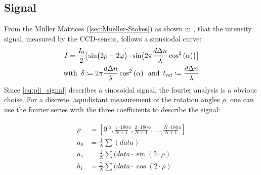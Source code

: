 \subsection{Signal}
% 
From the M\"{u}ller Matrices (\cref{sec:Mueller-Stokes}) as shown in \cite{MenzelMaster,MenzelDissertation}, that the intensity signal, measured by the \ac{CCD}-sensor, follows a sinusiodal curve:
% 
\begin{align}
\label{eq:pli_signal}
\begin{split}
I =\frac{I_0}{2}\bigl[ \sin\bigl(2\rho - 2\varphi \bigr)\cdot \sin \bigl( 2\pi\frac{d \textnormal{$\Delta n$}}{\lambda} \cos^2\left( \alpha \right) \bigr) \bigr] \\
\text{with} \enspace \delta \coloneqq 2\pi\frac{d \textnormal{$\Delta n$}}{\lambda} \cos^2\left( \alpha \right) \enspace 
\text{and} \enspace \textnormal{$t_\mathit{rel}$} \coloneqq \frac{d \textnormal{$\Delta n$}}{\lambda}
\end{split}
\end{align}
% 
Since \cref{eq:pli_signal} describes a sinosoidal signal, the fourier analysis is a obvious choise.
For a discrete, aquidistant measurement of the rotation angles $\rho$, one can use the fourier series with the three coefficients to describe the signal:
% 

\begin{align}
\begin{split}
\rho &= [\SI{0}{\degree}, \frac{1\cdot180}{N+1}\si{\degree}, \frac{2\cdot180}{N+1}\si{\degree}, ..., \frac{N\cdot180}{N+1}\si{\degree}]\\
a_0 &= \frac{1}{N} \sum(\mathit{data})\\
a_1 &= \frac{2}{N} \sum(\mathit{data} \cdot \sin(2 \cdot \rho)\\
b_1 &= \frac{2}{N} \sum(\mathit{data} \cdot \cos(2 \cdot \rho)
\end{split}
\end{align}

